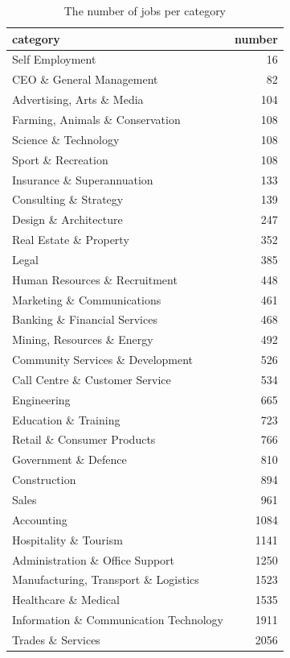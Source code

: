 \documentclass[11pt,a4paper,]{article}
\begin{document}
\begin{table}

\caption{\label{tab:category} The number of jobs per category  }
\centering
\begin{tabular}[t]{l|r}
\hline
category & number\\
\hline
Self Employment & 16\\
\hline
CEO \& General Management & 82\\
\hline
Advertising, Arts \& Media & 104\\
\hline
Farming, Animals \& Conservation & 108\\
\hline
Science \& Technology & 108\\
\hline
Sport \& Recreation & 108\\
\hline
Insurance \& Superannuation & 133\\
\hline
Consulting \& Strategy & 139\\
\hline
Design \& Architecture & 247\\
\hline
Real Estate \& Property & 352\\
\hline
Legal & 385\\
\hline
Human Resources \& Recruitment & 448\\
\hline
Marketing \& Communications & 461\\
\hline
Banking \& Financial Services & 468\\
\hline
Mining, Resources \& Energy & 492\\
\hline
Community Services \& Development & 526\\
\hline
Call Centre \& Customer Service & 534\\
\hline
Engineering & 665\\
\hline
Education \& Training & 723\\
\hline
Retail \& Consumer Products & 766\\
\hline
Government \& Defence & 810\\
\hline
Construction & 894\\
\hline
Sales & 961\\
\hline
Accounting & 1084\\
\hline
Hospitality \& Tourism & 1141\\
\hline
Administration \& Office Support & 1250\\
\hline
Manufacturing, Transport \& Logistics & 1523\\
\hline
Healthcare \& Medical & 1535\\
\hline
Information \& Communication Technology & 1911\\
\hline
Trades \& Services & 2056\\
\hline
\end{tabular}
\end{table}
\end{document}
